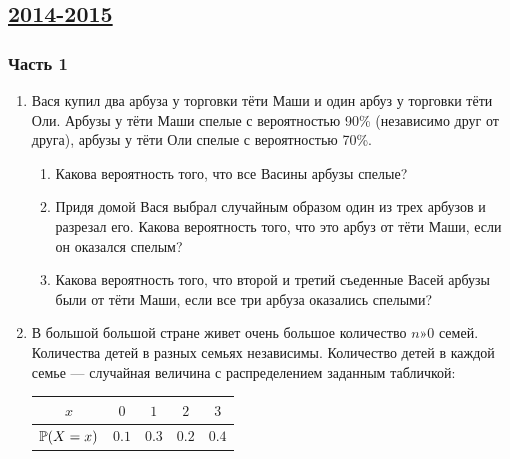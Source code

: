 \newpage
\subsection[2014-2015]{\hyperref[sec:sol_kr_01_ip_2014_2015]{2014-2015}}
\label{sec:kr_01_ip_2014_2015}

\subsubsection*{ Часть 1}

\begin{enumerate}


\item Вася купил два арбуза у торговки тёти Маши и один арбуз у торговки тёти Оли.
Арбузы у тёти Маши спелые с вероятностью 90\% (независимо друг от друга), арбузы
у тёти Оли спелые с вероятностью 70\%.
\begin{enumerate}
\item Какова вероятность того, что все Васины арбузы спелые?
\item Придя домой Вася выбрал случайным образом один из трех арбузов и разрезал его.
Какова вероятность того, что это арбуз от тёти Маши, если он оказался спелым?
\item Какова вероятность того, что второй и третий съеденные Васей арбузы были от
тёти Маши, если все три арбуза оказались спелыми?
\end{enumerate}


\item В большой большой стране живет очень большое количество $n»0$ семей.
Количества детей в разных семьях независимы. Количество детей в каждой семье —
случайная величина с распределением заданным табличкой:

\begin{center}
\begin{tabular}{ccccc}
\toprule
$x$ & $0$ & $1$ & $2$ & $3$ \\ \midrule
$\P(X=x)$ & $0.1$ & $0.3$ & $0.2$ & $0.4$ \\ \bottomrule
\end{tabular}
\end{center}


\end{enumerate}

